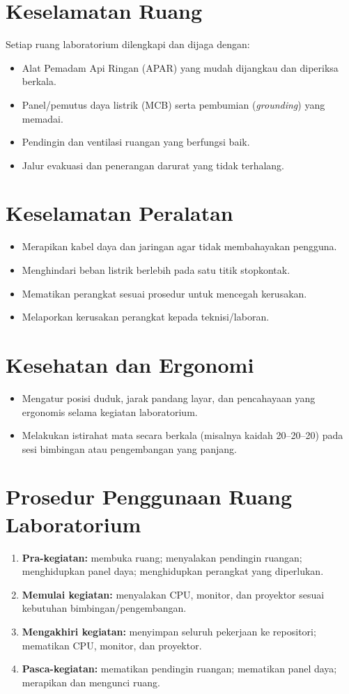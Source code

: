 \documentclass[12pt,a4paper]{report}
\begin{document}
\section{Keselamatan Ruang}
Setiap ruang laboratorium dilengkapi dan dijaga dengan:
\begin{itemize}
\item Alat Pemadam Api Ringan (APAR) yang mudah dijangkau dan diperiksa berkala.
\item Panel/pemutus daya listrik (MCB) serta pembumian (\emph{grounding}) yang memadai.
\item Pendingin dan ventilasi ruangan yang berfungsi baik.
\item Jalur evakuasi dan penerangan darurat yang tidak terhalang.
\end{itemize}

\section{Keselamatan Peralatan}
\begin{itemize}
\item Merapikan kabel daya dan jaringan agar tidak membahayakan pengguna.
\item Menghindari beban listrik berlebih pada satu titik stopkontak.
\item Mematikan perangkat sesuai prosedur untuk mencegah kerusakan.
\item Melaporkan kerusakan perangkat kepada teknisi/laboran.
\end{itemize}

\section{Kesehatan dan Ergonomi}
\begin{itemize}
\item Mengatur posisi duduk, jarak pandang layar, dan pencahayaan yang ergonomis selama kegiatan laboratorium.
\item Melakukan istirahat mata secara berkala (misalnya kaidah 20--20--20) pada sesi bimbingan atau pengembangan yang panjang.
\end{itemize}

\section{Prosedur Penggunaan Ruang Laboratorium}
\begin{enumerate}
\item \textbf{Pra-kegiatan:} membuka ruang; menyalakan pendingin ruangan; menghidupkan panel daya; menghidupkan perangkat yang diperlukan.
\item \textbf{Memulai kegiatan:} menyalakan CPU, monitor, dan proyektor sesuai kebutuhan bimbingan/pengembangan.
\item \textbf{Mengakhiri kegiatan:} menyimpan seluruh pekerjaan ke repositori; mematikan CPU, monitor, dan proyektor.
\item \textbf{Pasca-kegiatan:} mematikan pendingin ruangan; mematikan panel daya; merapikan dan mengunci ruang.
\end{enumerate}
\end{document}
